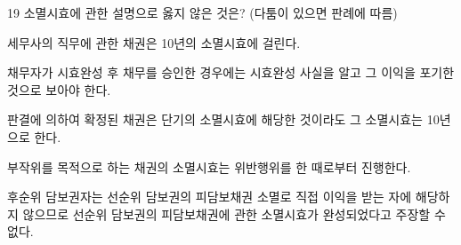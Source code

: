\begin{question}{19}
소멸시효에 관한 설명으로 옳지 않은 것은? (다툼이 있으면 판례에 따름)
\begin{choices}
  \item 세무사의 직무에 관한 채권은 10년의 소멸시효에 걸린다.
  \item 채무자가 시효완성 후 채무를 승인한 경우에는 시효완성 사실을 알고 그 이익을 포기한 것으로 보아야 한다.
  \item 판결에 의하여 확정된 채권은 단기의 소멸시효에 해당한 것이라도 그 소멸시효는 10년으로 한다.
  \item 부작위를 목적으로 하는 채권의 소멸시효는 위반행위를 한 때로부터 진행한다.
  \item 후순위 담보권자는 선순위 담보권의 피담보채권 소멸로 직접 이익을 받는 자에 해당하지 않으므로 선순위 담보권의 피담보채권에 관한 소멸시효가 완성되었다고 주장할 수 없다.
\end{choices}
\end{question}
